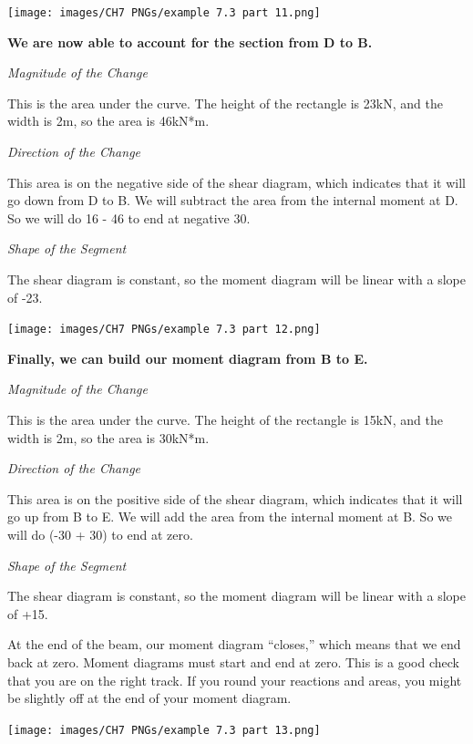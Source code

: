 \documentclass[
  letterpaper,
  DIV=11,
  numbers=noendperiod]{scrreprt}
\begin{document}
\begin{tcolorbox}
\begin{tcolorbox}
\begin{center}
\texttt{[image: images/CH7 PNGs/example 7.3 part 11.png]}
\end{center}

\textbf{We are now able to account for the section from D to B.}

\emph{Magnitude of the Change}

This is the area under the curve. The height of the rectangle is 23kN,
and the width is 2m, so the area is 46kN*m.

\emph{Direction of the Change}

This area is on the negative side of the shear diagram, which indicates
that it will go down from D to B. We will subtract the area from the
internal moment at D. So we will do 16 - 46 to end at negative 30.

\emph{Shape of the Segment}

The shear diagram is constant, so the moment diagram will be linear with
a slope of -23.

\begin{center}
\texttt{[image: images/CH7 PNGs/example 7.3 part 12.png]}
\end{center}

\textbf{Finally, we can build our moment diagram from B to E.}

\emph{Magnitude of the Change}

This is the area under the curve. The height of the rectangle is 15kN,
and the width is 2m, so the area is 30kN*m.

\emph{Direction of the Change}

This area is on the positive side of the shear diagram, which indicates
that it will go up from B to E. We will add the area from the internal
moment at B. So we will do (-30 + 30) to end at zero.

\emph{Shape of the Segment}

The shear diagram is constant, so the moment diagram will be linear with
a slope of +15.

At the end of the beam, our moment diagram ``closes,'' which means that
we end back at zero. Moment diagrams must start and end at zero. This is
a good check that you are on the right track. If you round your
reactions and areas, you might be slightly off at the end of your moment
diagram.

\begin{center}
\texttt{[image: images/CH7 PNGs/example 7.3 part 13.png]}
\end{center}


\end{tcolorbox}
\end{tcolorbox}
\end{document}

